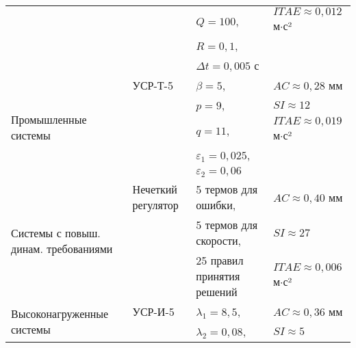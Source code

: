 \begin{table}[ht]
\begin{tabular}{p{3.5cm}p{3cm}p{4cm}p{4cm}}
		                                                                  &                                  & $Q=100$,                    & $ITAE \approx 0,012$ м$\cdot$с² \\
		                                                                  &                                  & $R=0,1$,                    &                                 \\
		                                                                  &                                  & $\Delta t=0,005$ с          &                                 \\
		\hline
		\multirow{5}{3.5cm}{Промышленные системы}                         & УСР-Т-5                          & $\beta=5$,                  & $AC \approx 0,28$ мм            \\
		                                                                  &                                  & $p=9$,                      & $SI \approx 12$                 \\
		                                                                  &                                  & $q=11$,                     & $ITAE \approx 0,019$ м$\cdot$с² \\
		                                                                  &                                  & $\varepsilon_1=0,025$,      &                                 \\
		                                                                  &                                  & $\varepsilon_2=0,06$        &                                 \\
		\hline
		\multirow{3}{3.5cm}{Системы с повыш. динам. требованиями}         & Нечеткий регулятор               & 5 термов для ошибки,        & $AC \approx 0,40$ мм            \\
		                                                                  &                                  & 5 термов для скорости,      & $SI \approx 27$                 \\
		                                                                  &                                  & 25 правил принятия решений  & $ITAE \approx 0,006$ м$\cdot$с² \\
		\hline
		\multirow{4}{3.5cm}{Высоконагруженные системы}                    & УСР-И-5                          & $\lambda_1=8,5$,            & $AC \approx 0,36$ мм            \\
		                                                                  &                                  & $\lambda_2=0,08$,           & $SI \approx 5$                  \\

\end{tabular}
\end{table}
